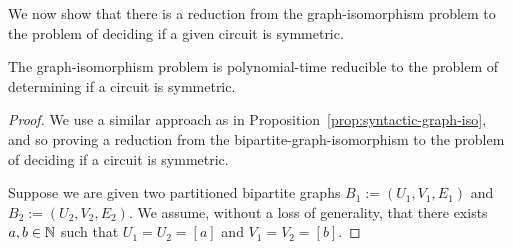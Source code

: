 \documentclass[../paper.tex]{subfiles}
\begin{document}
We now show that there is a reduction from the graph-isomorphism problem to the
problem of deciding if a given circuit is symmetric.

\begin{prop}
  The graph-isomorphism problem is polynomial-time reducible to the problem of
  determining if a circuit is symmetric.
  \label{prop:graph-iso-symmetric}
\end{prop}

\begin{proof}
  We use a similar approach as in Proposition~\ref{prop:syntactic-graph-iso},
  and so proving a reduction from the bipartite-graph-isomorphism to the problem
  of deciding if a circuit is symmetric.
 
  Suppose we are given two partitioned bipartite graphs $B_1 := (U_1, V_1, E_1)$
  and $B_2 := (U_2, V_2, E_2)$. We assume, without a loss of generality, that
  there exists $a, b \in \mathbb{N}$ such that $U_1 = U_2 = [a]$ and $V_1 = V_2 =
  [b]$.


\end{proof}
\end{document}
